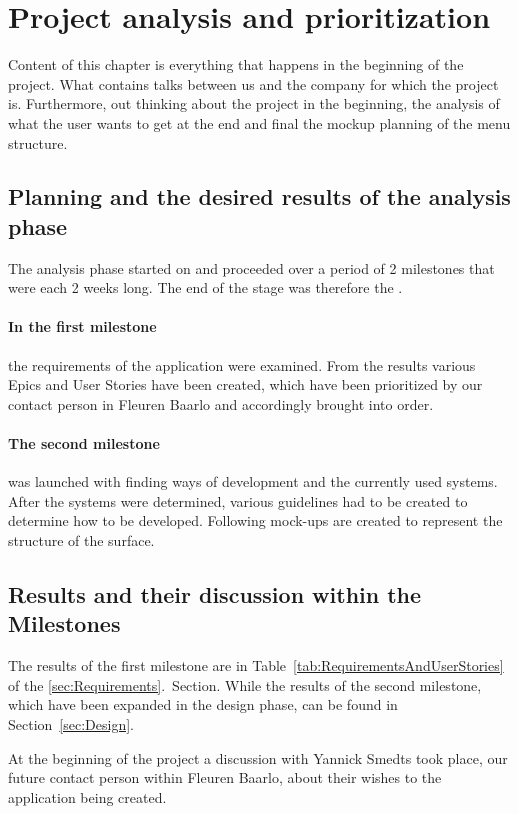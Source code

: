 \section{Project analysis and prioritization}
\label{analysis}
Content of this chapter is everything that happens in the beginning of the project. What contains talks between us and the company for which the project is. Furthermore, out thinking about the project in the beginning, the analysis of what the user wants to get at the end and final the mockup planning of the menu structure.

\subsection{Planning and the desired results of the analysis phase}
The analysis phase started on  and proceeded over a period of 2 milestones that were each 2 weeks long. The end of the stage was therefore the .

\paragraph{In the first milestone} the requirements of the application were examined. From the results various Epics and User Stories have been created, which have been prioritized by our contact person in Fleuren Baarlo and accordingly brought into order.

\paragraph{The second milestone} was launched with finding ways of development and the currently used systems. After the systems were determined, various guidelines had to be created to determine how to be developed.
Following mock-ups are created to represent the structure of the surface.

\subsection{Results and their discussion within the Milestones}
The results of the first milestone are in Table~\ref{tab:RequirementsAndUserStories} of the \ref{sec:Requirements}.~Section. While the results of the second milestone, which have been expanded in the design phase, can be found in Section~\ref{sec:Design}.

At the beginning of the project a discussion with Yannick Smedts took place, our future contact person within Fleuren Baarlo, about their wishes to the application being created.

